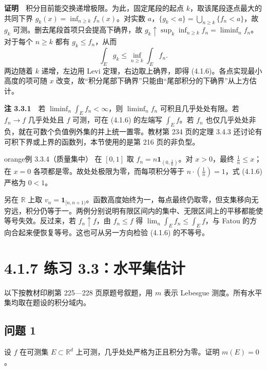 \documentclass[11pt,a4paper]{article}
\begin{document}
\textbf{证明}　积分目前能交换递增极限。为此，固定尾段的起点
\(k\)，取该尾段逐点最大的共同下界 \(g_k(x)=\inf_{n\ge k}f_n(x)\)。对实数
\(a\)，\(\{g_k<a\}=\bigcup_{n\ge k}\{f_n<a\}\)，故 \(g_k\)
可测。删去尾段首项只会提高下确界，故
\(g_k\uparrow\sup_k\inf_{n\ge k} f_n=\liminf_n f_n\)。对于每个
\(n\ge k\) 都有 \(g_k\le f_n\)，从而 \begin{equation*}
\int_E g_k\le\inf_{n\ge k}\int_E f_n .
\end{equation*} 两边随着 \(k\) 递增，左边用 Levi 定理，右边取上确界，即得
(4.1.6)。各点实现最小高度的项可随 \(x\)
改变，故``积分尾部下确界''只能由``尾部积分的下确界''从上方估计。

\textbf{注 3.3.1}　若 \(\liminf_n\int_E f_n<\infty\)，则
\(\liminf_n f_n\) 可积且几乎处处有限。若 \(f_n\to f\) 几乎处处且 \(f\)
可测，可在 (4.1.6) 的左端写 \(\int_E f\)。若 \(f_n\)
也仅几乎处处非负，就在可数个负值例外集的并上统一置零。教材第 234
页的定理 3.4.3 还讨论有可积下界或上界的函数列，本节使用的是第 216
页的非负型。

\begin{sboxenv}{orange}{例 3.3.4（质量集中）}
在 \([0,1]\) 取 \(f_n=n\mathbf1_{(0,\frac1n)}\)。对 \(x>0\)，最终
\(\frac1n\le x\)；在 \(x=0\) 各项都是零。故处处极限为零，而每项积分等于
\(n\cdot(\frac1n)=1\)，式 (4.1.6) 严格为 \(0<1\)。

\end{sboxenv}

另在 \(\mathbb R\) 上取
\(v_n=\mathbf1_{[n,n+1)}\)。函数高度始终为一，每点最终仍取零，但支集移向无穷远，积分仍等于一。两例分别说明有限区间内的集中、无限区间上的平移都能使等号失效。反过来，若
\(f_n\uparrow f\)，由 \(f_n\le f\) 得
\(\lim_n\int_E f_n\le\int_E f\)，与 Fatou
的方向合起来便恢复等号。这也可从另一方向检验 (4.1.6) 的不等号。

\clearpage\section[\S{}4.1.7 练习
3.3：水平集估计]{4.1.7 练习
3.3：水平集估计}\label{ux7ec3ux4e60-3.3ux6c34ux5e73ux96c6ux4f30ux8ba1}

以下按教材印刷第 225---228 页原题号叙题，用 \(m\) 表示 Lebesgue
测度。所有水平集均取在题设的积分域内。

\subsection{问题 1}\label{ux95eeux9898-1}

设 \(f\) 在可测集 \(E\subset\mathbb R^d\)
上可测，几乎处处严格为正且积分为零。证明 \(m(E)=0\)。
\end{document}

